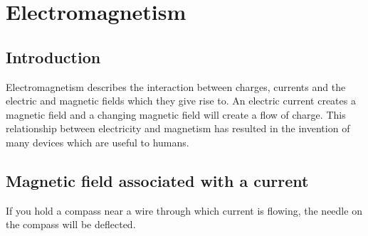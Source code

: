 \chapter{Electromagnetism}
\label{p:em:em11}

\section{Introduction}

Electromagnetism describes the interaction between charges, currents and the electric and magnetic fields which they give rise to. An electric current creates a magnetic field and a changing magnetic field will create a flow of charge. This relationship between electricity and magnetism has resulted in the invention of many devices which are useful to humans.\\
\section{Magnetic field associated with a current}
If you hold a compass near a wire through which current is
flowing, the needle on the compass will be deflected.

